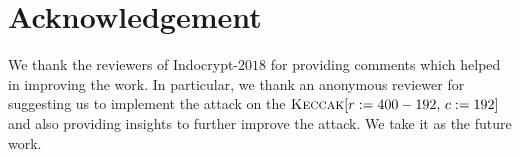 \documentclass[runningheads]{llncs}
\newcommand{\Keccak}{\mbox{\textsc{Keccak}}}
\begin{document}
\section*{Acknowledgement} We thank the reviewers of Indocrypt-$2018$ for providing comments which helped in
improving the work. In particular, we thank an anonymous reviewer for suggesting us to implement the attack on the $\Keccak[r:=400-192,\, c:=192]$ and also providing insights to further improve the attack. We take it as the future work. 
\nocite{*}



\end{document}
